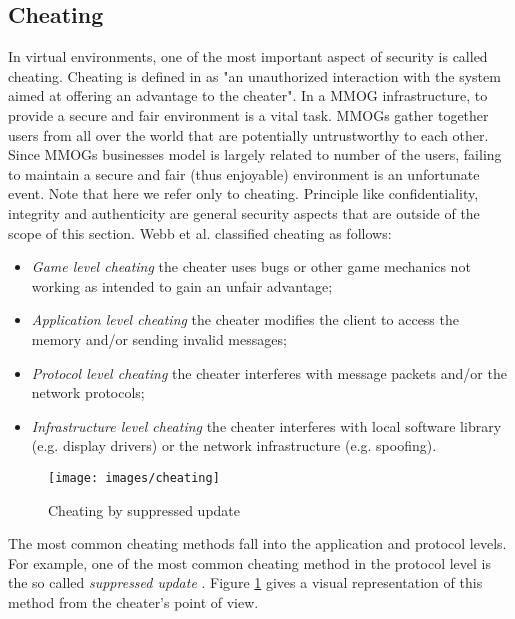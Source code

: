 \documentclass[final,10pt,a5paper]{phdimt}
\theoremstyle{definition}
\begin{document}
\subsection{Cheating}

In virtual environments, one of the most important aspect of security is called cheating. Cheating is defined in \cite{Neumann2007} as "an unauthorized interaction with the system aimed at offering an advantage to the cheater".
In a MMOG infrastructure, to provide a secure and fair environment is a vital task.
MMOGs gather together users from all over the world that are potentially untrustworthy to each other.
Since MMOGs businesses model is largely related to number of the users, failing to maintain a secure and fair (thus enjoyable) environment is an unfortunate event.
Note that here we refer only to cheating. Principle like confidentiality, integrity and authenticity are general security aspects that are outside of the scope of this section.
Webb et al. \cite{Webb2007} classified cheating as follows:
\begin{itemize}
\item \textit{Game level cheating} the cheater uses bugs or other game mechanics not working as intended to gain an unfair advantage;
\item \textit{Application level cheating} the cheater modifies the client to access the memory and/or sending invalid messages;
\item \textit{Protocol level cheating} the cheater interferes with message packets and/or the network protocols;
\item \textit{Infrastructure level cheating} the cheater interferes with local software library (e.g. display drivers) or the network infrastructure (e.g. spoofing).
\end{itemize}

\begin{figure}
\centering
\texttt{[image: images/cheating]}
\caption{Cheating by suppressed update}\label{fig:cheating}
\end{figure}


The most common cheating methods fall into the application and protocol levels.
For example, one of the most common cheating method in the protocol level is the so called \textit{suppressed update} \cite{Webb2007}. Figure \ref{fig:cheating} gives a visual representation of this method from the cheater's point of view. 
\end{document}
